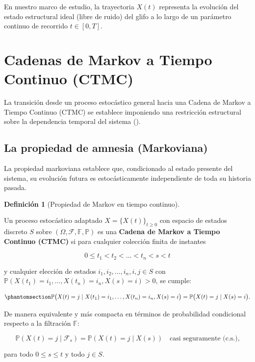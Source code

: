 \documentclass[
  spanish,
  us-letterpaper,
]{scrreprt}
\theoremstyle{definition}
\newtheorem{definition}{Definición}[chapter]
\theoremstyle{remark}
\begin{document}
En nuestro marco de estudio, la trayectoria \(X(t)\) representa la
evolución del estado estructural ideal (libre de ruido) del glifo a lo
largo de un parámetro continuo de recorrido \(t \in [0, T]\).

\section{Cadenas de Markov a Tiempo Continuo
(CTMC)}\label{cadenas-de-markov-a-tiempo-continuo-ctmc}

La transición desde un proceso estocástico general hacia una Cadena de
Markov a Tiempo Continuo (CTMC) se establece imponiendo una restricción
estructural sobre la dependencia temporal del sistema
().

\subsection{La propiedad de amnesia
(Markoviana)}\label{la-propiedad-de-amnesia-markoviana}

La propiedad markoviana establece que, condicionado al estado presente
del sistema, su evolución futura es estocásticamente independiente de
toda su historia pasada.

\begin{definition}[Propiedad de Markov en tiempo
continuo]\protect\hypertarget{def-propiedad-markov}{}\label{def-propiedad-markov}

Un proceso estocástico adaptado \(X = \{X(t)\}_{t \ge 0}\) con espacio
de estados discreto \(S\) sobre
\((\Omega, \mathcal{F}, \mathbb{F}, \mathbb{P})\) es una \textbf{Cadena
de Markov a Tiempo Continuo (CTMC)} si para cualquier colección finita
de instantes

\[
0 \le t_1 < t_2 < \dots < t_n < s < t
\]

y cualquier elección de estados \(i_1, i_2, \dots, i_n, i, j \in S\) con
\(\mathbb{P}(X(t_1)=i_1, \dots, X(t_n)=i_n, X(s)=i) > 0\), se cumple:

\begin{equation}\phantomsection\label{eq-propiedad-markov}{
\mathbb{P}\bigl(X(t) = j \mid X(t_1) = i_1, \dots, X(t_n) = i_n, X(s) = i\bigr)
=
\mathbb{P}\bigl(X(t) = j \mid X(s) = i\bigr).
}\end{equation}

De manera equivalente y más compacta en términos de probabilidad
condicional respecto a la filtración \(\mathbb{F}\):

\[
\mathbb{P}(X(t) = j \mid \mathcal{F}_s)
=
\mathbb{P}(X(t) = j \mid X(s))
\quad \text{casi seguramente (c.s.),}
\]

para todo \(0 \le s \le t\) y todo \(j \in S\).

\end{definition}
\end{document}
